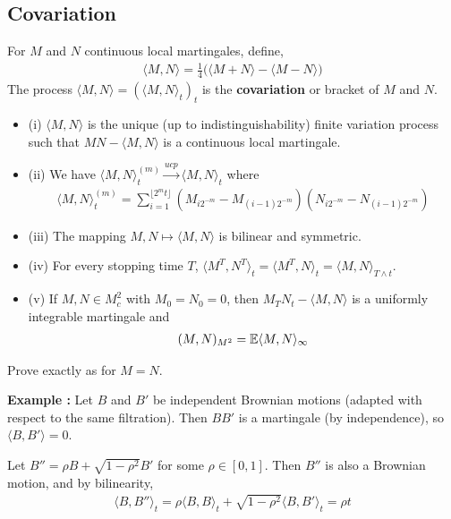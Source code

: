 \documentclass[12pt,a4paper]{article}
\newenvironment{proof}
{\begin{changemargin}{0.5cm}{0.5cm} 
	}%
	{\end{changemargin}
}
\renewenvironment{i}
{\begin{itemize} 
	}%
	{\end{itemize}
}
\newenvironment{p}
{\begin{proof} 
	}%
	{\end{proof}
}
\begin{document}
\subsection{Covariation}

 For $M$ and $N$ continuous local martingales, define,
\begin{align*}
\langle M, N \rangle = \frac{1}{4} \big( \langle M+N \rangle - \langle M- N\rangle \big)
\end{align*}
The process $\langle M, N \rangle = (\langle M, N\rangle_{t})_t$ is the \textbf{covariation} or bracket of $M$ and $N$.
\s

\prop 
\begin{i}
\item[(i)] $\langle M, N\rangle$ is the unique (up to indistinguishability) finite variation process such that $MN -\langle M, N\rangle$ is a continuous local martingale.
\item[(ii)] We have $\langle M, N \rangle_t^{(m)} \xrightarrow{ucp} \langle M, N \rangle_{t}$ where
\begin{align*}
\langle M, N \rangle_t^{(m)} = \sum_{i=1}^{\lfloor 2^m t \rfloor} (M_{i2^{-m}}-M_{(i-1)2^{-m}})(N_{i2^{-m}}-N_{(i-1)2^{-m}})
\end{align*}
\item[(iii)] The mapping $M,N \mapsto \langle M, N \rangle$ is bilinear and symmetric.
\item[(iv)] For every stopping time $T$, $\langle M^T, N^T \rangle_t = \langle M^T, N \rangle_t = \langle M, N \rangle_{T\wedge t}$.
\item[(v)] If $M, N \in M_c^2$ with $M_0 =N_0 =0$, then $M_T N_t - \langle M, N \rangle$ is a uniformly integrable martingale and
\begin{align*}
(M, N)_{M^2} = \mathbb{E} \langle M, N \rangle_{\infty}
\end{align*}
\end{i}
\begin{p}
\pf Prove exactly as for $M = N$.
\end{p}
\s

\textbf{Example :} Let $B$ and $B'$ be independent Brownian motions (adapted with respect to the same filtration). Then $BB'$ is a martingale (by independence), so $\langle B, B' \rangle =0$.

\quad Let $B'' = \rho B + \sqrt{1-\rho^2} B'$ for some $\rho \in [0, 1]$. Then $B''$ is also a Brownian motion, and by bilinearity,
\begin{align*}
\langle B, B''\rangle_t = \rho \langle B, B \rangle_t + \sqrt{1-\rho^2} \langle B, B' \rangle_t =\rho t
\end{align*}
\s
\end{document}

